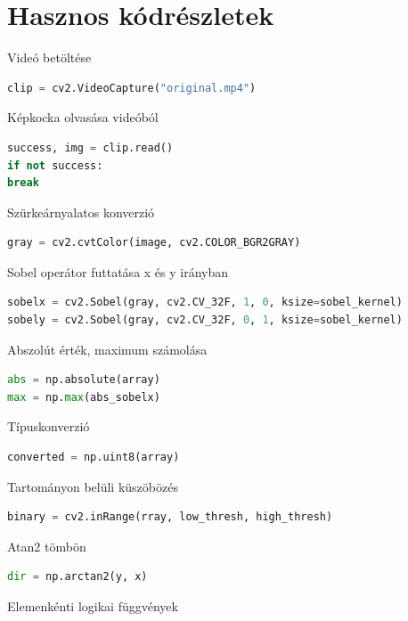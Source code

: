 \documentclass[12pt,a4paper,oneside]{report}             %
\begin{document}
\chapter{Hasznos kódrészletek}

Videó betöltése

\begin{lstlisting}[language=Python]
clip = cv2.VideoCapture("original.mp4")
\end{lstlisting}

Képkocka olvasása videóból

\begin{lstlisting}[language=Python]
success, img = clip.read()
if not success:
break
\end{lstlisting}

Szürkeárnyalatos konverzió

\begin{lstlisting}[language=Python]
gray = cv2.cvtColor(image, cv2.COLOR_BGR2GRAY)
\end{lstlisting}

Sobel operátor futtatása x és y irányban

\begin{lstlisting}[language=Python]
sobelx = cv2.Sobel(gray, cv2.CV_32F, 1, 0, ksize=sobel_kernel)
sobely = cv2.Sobel(gray, cv2.CV_32F, 0, 1, ksize=sobel_kernel)
\end{lstlisting}

Abszolút érték, maximum számolása

\begin{lstlisting}[language=Python]
abs = np.absolute(array)
max = np.max(abs_sobelx)
\end{lstlisting}

Típuskonverzió

\begin{lstlisting}[language=Python]
converted = np.uint8(array)
\end{lstlisting}

Tartományon belüli küszöbözés

\begin{lstlisting}[language=Python]
binary = cv2.inRange(rray, low_thresh, high_thresh)
\end{lstlisting}

Atan2 tömbön

\begin{lstlisting}[language=Python]
dir = np.arctan2(y, x)
\end{lstlisting}

Elemenkénti logikai függvények
\end{document}
